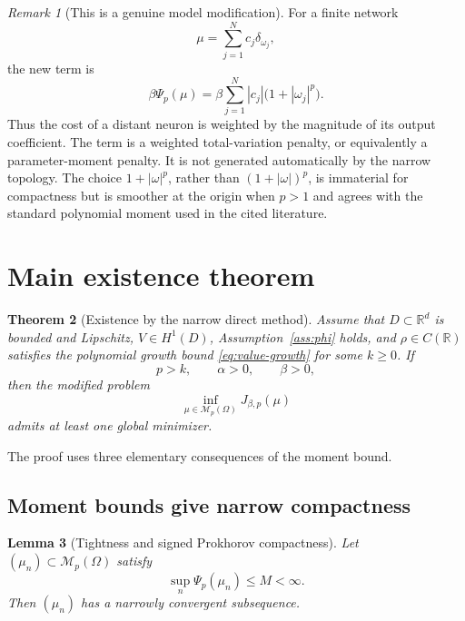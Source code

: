 \documentclass[11pt]{amsart}
\newtheorem{theorem}{Theorem}[section]
\newtheorem{lemma}[theorem]{Lemma}
\theoremstyle{definition}
\theoremstyle{remark}
\newtheorem{remark}[theorem]{Remark}
\newcommand{\R}{\mathbb{R}}
\newcommand{\M}{\mathcal{M}}
\begin{document}
\begin{remark}[This is a genuine model modification]
For a finite network
\[
  \mu=\sum_{j=1}^N c_j\delta_{\omega_j},
\]
the new term is
\[
  \beta\Psi_p(\mu)
  =
  \beta\sum_{j=1}^N |c_j|\bigl(1+|\omega_j|^p\bigr).
\]
Thus the cost of a distant neuron is weighted by the magnitude of its output
coefficient.  The term is a weighted total-variation penalty, or equivalently
a parameter-moment penalty.  It is not generated automatically by the narrow
topology.
The choice $1+|\omega|^p$, rather than $(1+|\omega|)^p$, is immaterial for
compactness but is smoother at the origin when $p>1$ and agrees with the
standard polynomial moment used in the cited literature.
\end{remark}

\section{Main existence theorem}

\begin{theorem}[Existence by the narrow direct method]
\label{thm:narrow-existence}
Assume that $D\subset\R^d$ is bounded and Lipschitz,
$V\in H^1(D)$, Assumption~\ref{ass:phi} holds, and
$\rho\in C(\R)$ satisfies the polynomial growth bound
\eqref{eq:value-growth} for some $k\geq0$.  If
\[
  p>k,\qquad \alpha>0,\qquad \beta>0,
\]
then the modified problem
\[
  \inf_{\mu\in\M_p(\Omega)}J_{\beta,p}(\mu)
\]
admits at least one global minimizer.
\end{theorem}

The proof uses three elementary consequences of the moment bound.

\subsection{Moment bounds give narrow compactness}

\begin{lemma}[Tightness and signed Prokhorov compactness]
\label{lem:moment-compactness}
Let $(\mu_n)\subset\M_p(\Omega)$ satisfy
\[
  \sup_n\Psi_p(\mu_n)\leq M<\infty.
\]
Then $(\mu_n)$ has a narrowly convergent subsequence.
\end{lemma}
\end{document}
